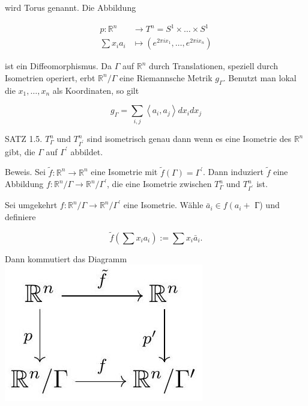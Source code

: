 \documentclass[10pt]{article}
\begin{document}
wird Torus genannt. Die Abbildung

$$
\begin{aligned}
p: \mathbb{R}^{n} & \rightarrow T^{n}=S^{1} \times \ldots \times S^{1} \\
\sum x_{i} a_{i} & \mapsto\left(e^{2 \pi i x_{1}}, \ldots, e^{2 \pi i x_{n}}\right)
\end{aligned}
$$

ist ein Diffeomorphismus. Da $\Gamma$ auf $\mathbb{R}^{n}$ durch Translationen, speziell durch Isometrien operiert, erbt $\mathbb{R}^{n} / \Gamma$ eine Riemannsche Metrik $g_{\Gamma}$. Benutzt man lokal die $x_{1}, \ldots, x_{n}$ als Koordinaten, so gilt

$$
g_{\Gamma}=\sum_{i, j}\left\langle a_{i}, a_{j}\right\rangle d x_{i} d x_{j}
$$

SATZ 1.5. $T_{\Gamma}^{n}$ und $T_{\Gamma^{\prime}}^{n}$ sind isometrisch genau dann wenn es eine Isometrie des $\mathbb{R}^{n}$ gibt, die $\Gamma$ auf $\Gamma^{\prime}$ abbildet.

Beweis. Sei $\tilde{f}: \mathbb{R}^{n} \rightarrow \mathbb{R}^{n}$ eine Isometrie mit $\tilde{f}(\Gamma)=\Gamma^{\prime}$. Dann induziert $\tilde{f}$ eine Abbildung $f: \mathbb{R}^{n} / \Gamma \rightarrow \mathbb{R}^{n} / \Gamma^{\prime}$, die eine Isometrie zwischen $T_{\Gamma}^{n}$ und $T_{\Gamma^{\prime}}^{n}$ ist.

Sei umgekehrt $f: \mathbb{R}^{n} / \Gamma \rightarrow \mathbb{R}^{n} / \Gamma^{\prime}$ eine Isometrie. Wähle $\bar{a}_{i} \in f\left(a_{i}+\right.$ Г) und definiere

$$
\tilde{f}\left(\sum x_{i} a_{i}\right):=\sum x_{i} \bar{a}_{i} .
$$

Dann kommutiert das Diagramm\\
\includegraphics[max width=\textwidth, center]{2025_05_20_3825c151ba0898b77b6eg-019}
\end{document}
